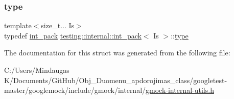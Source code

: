 \mbox{\label{structtesting_1_1internal_1_1int__pack_af7784346f052decccd650110f88694a4}} 
\subsubsection{\texorpdfstring{type}{type}\hspace{0.1cm}{\footnotesize\ttfamily [2/2]}}
{\footnotesize\ttfamily template$<$size\+\_\+t... Is$>$ \\
typedef \mbox{\hyperlink{structtesting_1_1internal_1_1int__pack}{int\+\_\+pack}} \mbox{\hyperlink{structtesting_1_1internal_1_1int__pack}{testing\+::internal\+::int\+\_\+pack}}$<$ Is $>$\+::\mbox{\hyperlink{structtesting_1_1internal_1_1int__pack_af7784346f052decccd650110f88694a4}{type}}}



The documentation for this struct was generated from the following file\+:\begin{DoxyCompactItemize}
\item 
C\+:/\+Users/\+Mindaugas K/\+Documents/\+Git\+Hub/\+Obj\+\_\+\+Duomenu\+\_\+apdorojimas\+\_\+class/googletest-\/master/googlemock/include/gmock/internal/\mbox{\hyperlink{googletest-master_2googlemock_2include_2gmock_2internal_2gmock-internal-utils_8h}{gmock-\/internal-\/utils.\+h}}\end{DoxyCompactItemize}

